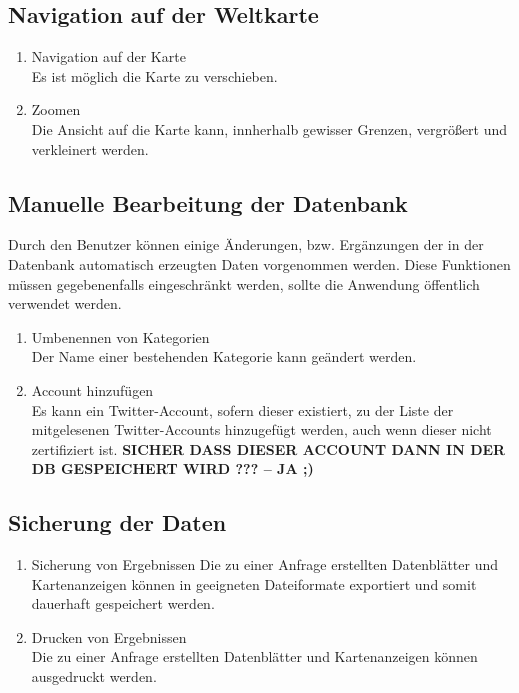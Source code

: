 \subsection{Navigation auf der Weltkarte}
\begin{enumerate}[ align=left, label={\textbf{\textbackslash F30\arabic*0\textbackslash}} ]
	\item Navigation auf der Karte \label{PF:Navigation} \\
	Es ist möglich die Karte zu verschieben.
	\item Zoomen \label{PF:Zoomen} \\
	Die Ansicht auf die Karte kann, innherhalb gewisser Grenzen, vergrößert und verkleinert werden.
\end{enumerate}	
\subsection{Manuelle Bearbeitung der Datenbank}
Durch den Benutzer können einige Änderungen, bzw. Ergänzungen der in der Datenbank automatisch erzeugten Daten vorgenommen werden. Diese Funktionen müssen gegebenenfalls eingeschränkt werden, sollte die Anwendung öffentlich verwendet werden.
\begin{enumerate}[ align=left, label={\textbf{\textbackslash F40\arabic*0\textbackslash}}]
	\item Umbenennen von Kategorien \label{PF:KategorieUm} \\
	Der Name einer bestehenden Kategorie kann geändert werden.
	\item Account hinzufügen \label{PF:AccountHinzu} \\
	Es kann ein Twitter-Account, sofern dieser existiert, zu der Liste der mitgelesenen Twitter-Accounts hinzugefügt werden, auch wenn dieser nicht zertifiziert ist.
	\textbf{SICHER DASS DIESER ACCOUNT DANN IN DER DB GESPEICHERT WIRD ??? -- JA ;)}
\end{enumerate}
\subsection{Sicherung der Daten}
\begin{enumerate}[ align=left, label={\textbf{\textbackslash F50\arabic*0\textbackslash}}]
	\item Sicherung von Ergebnissen \label{PF:Sicherung}
	Die zu einer Anfrage erstellten Datenblätter und Kartenanzeigen können in geeigneten Dateiformate exportiert und somit dauerhaft gespeichert werden.
	\item Drucken von Ergebnissen \label{PF:Drucken} \\
	Die zu einer Anfrage erstellten Datenblätter und Kartenanzeigen können ausgedruckt werden. 
\end{enumerate}
